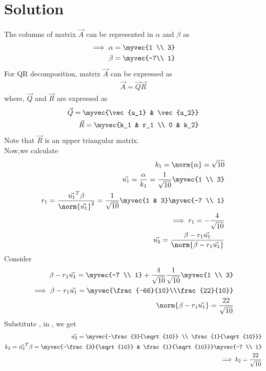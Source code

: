 \documentclass[journal,12pt,twocolumn]{IEEEtran}
\begin{document}
\section{Solution}
The columns of matrix $\vec{A}$ can be represented in $\alpha$ and $\beta$ as
\begin{align}
    \implies\alpha=\myvec{1 \\ 3}\\
    \beta=\myvec{-7\\ 1}
\end{align}
For QR decomposition, matrix $\vec{A}$ can be expressed as
\begin{align}
    \vec{A}=\vec{Q}\vec{R}\label{decomp}
\end{align}
where, $\vec{Q}$ and $\vec{R}$ are expressed as
\begin{align}
    \vec{Q}=\myvec{\vec{u_1} & \vec{u_2}}\label{Q}\\
    \vec{R}=\myvec{k_1 & r_1 \\ 0 & k_2}\label{R}
\end{align}
Note that $\vec{R}$ is an upper triangular matrix.\\
Now,we calculate
\begin{align}
    k_1=\norm{\alpha}=\sqrt{10}\\
    \vec{u_1}=\frac{\alpha}{k_1}=\frac{1}{\sqrt{10}}\myvec{1 \\ 3}\\
    r_1=\frac{\vec{u_1}^T\beta}{\norm{\vec{u_1}}^2}=\frac{1}{\sqrt{10}}\myvec{1 & 3}\myvec{-7 \\ 1}\\
    \implies r_1=-\frac{4}{\sqrt{10}}\\
    \vec{u_2}=\frac{\beta-r_1\vec{u_1}}{\norm{\beta-r_1\vec{u_1}}}\label{u2}
\end{align}
Consider
\begin{align}
    \beta-r_1\vec{u_1}=\myvec{-7 \\ 1}+\frac{4}{\sqrt{10}}\frac{1}{\sqrt{10}}\myvec{1 \\ 3}\\
    \implies\beta-r_1\vec{u_1}=\myvec{\frac{-66}{10}\\\frac{22}{10}}\label{num}\\
    \norm{\beta-r_1\vec{u_1}}=\frac{{22}}{\sqrt{10}}\label{den}
\end{align}
Substitute , in , we get
\begin{align}
    \vec{u_2}=\myvec{-\frac{3}{\sqrt{10}} \\ \frac{1}{\sqrt{10}}}\\
    k_2=\vec{u_2}^T\beta=\myvec{-\frac{3}{\sqrt{10}} & \frac{1}{\sqrt{10}}}\myvec{-7 \\ 1}\\
    \implies k_2=\frac{22}{\sqrt{10}}
\end{align}
\end{document}
